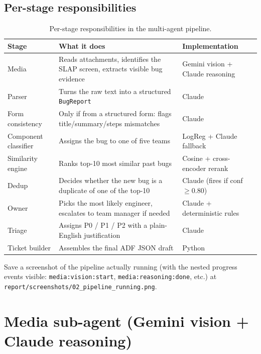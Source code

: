 \documentclass[11pt,a4paper]{article}
\begin{document}
\subsection{Per-stage responsibilities}

\begin{table}[h]
\centering
\footnotesize
\begin{tabularx}{\linewidth}{lXl}
\toprule
\textbf{Stage} & \textbf{What it does} & \textbf{Implementation} \\
\midrule
Media & Reads attachments, identifies the SLAP screen, extracts visible bug evidence & Gemini vision + Claude reasoning \\
Parser & Turns the raw text into a structured \texttt{BugReport} & Claude \\
Form consistency & Only if from a structured form: flags title/summary/steps mismatches & Claude \\
Component classifier & Assigns the bug to one of five teams & LogReg + Claude fallback \\
Similarity engine & Ranks top-10 most similar past bugs & Cosine + cross-encoder rerank \\
Dedup & Decides whether the new bug is a duplicate of one of the top-10 & Claude (fires if conf $\geq 0.80$) \\
Owner & Picks the most likely engineer, escalates to team manager if needed & Claude + deterministic rules \\
Triage & Assigns P0 / P1 / P2 with a plain-English justification & Claude \\
Ticket builder & Assembles the final ADF JSON draft & Python \\
\bottomrule
\end{tabularx}
\caption{Per-stage responsibilities in the multi-agent pipeline.}
\end{table}

\begin{screenshotbox}
Save a screenshot of the pipeline actually running (with the nested
progress events visible: \texttt{media:vision:start},
\texttt{media:reasoning:done}, etc.) at
\texttt{report/screenshots/02\_pipeline\_running.png}.
\end{screenshotbox}

\newpage

\section{Media sub-agent (Gemini vision + Claude reasoning)}
\end{document}
